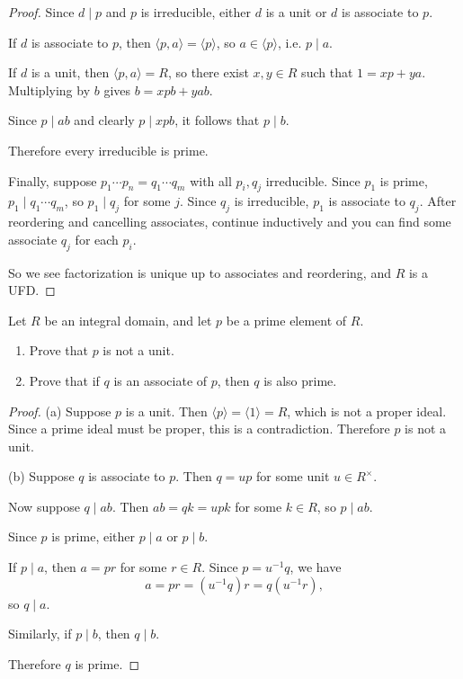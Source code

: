 \documentclass[addpoints,10pt]{exam}
\theoremstyle{plain}
\theoremstyle{definition}
\newtheorem{prob}[thm]{Problem}
\theoremstyle{plain}
\theoremstyle{definition}
\let\oldprob\prob
\let\endoldprob\endprob
\renewenvironment{prob}
  {\begin{singlespace}\oldprob}
  {\endoldprob\end{singlespace}}
\begin{document}
\begin{proof}
Since $d\mid p$ and $p$ is irreducible, either $d$ is a unit or $d$ is
associate to $p$.

If $d$ is associate to $p$, then
$\langle p,a\rangle=\langle p\rangle$,
so $a\in\langle p\rangle$, i.e. $p\mid a$.

If $d$ is a unit, then
$\langle p,a\rangle=R$, so there exist $x,y\in R$ such that
$1=xp+ya$.
Multiplying by $b$ gives
$b=xpb+yab$.

Since $p\mid ab$ and clearly $p\mid xpb$, it follows that $p\mid b$.

Therefore every irreducible is prime.

Finally, suppose
$p_1\cdots p_n=q_1\cdots q_m$
with all $p_i,q_j$ irreducible. Since $p_1$ is prime,
$p_1\mid q_1\cdots q_m$, so $p_1\mid q_j$ for some $j$. Since $q_j$ is
irreducible, $p_1$ is associate to $q_j$. After reordering and cancelling
associates, continue inductively and you can find some associate $q_{j}$ for each $p_{i}$.

So we see factorization is unique up to associates and reordering, and $R$
is a UFD.
\end{proof}

\newpage
\begin{prob}
Let $R$ be an integral domain, and let $p$ be a prime element of $R$.

\begin{enumerate}[label=(\alph*)]
\item Prove that $p$ is not a unit.

\item Prove that if $q$ is an associate of $p$, then $q$ is also prime.
\end{enumerate}
\end{prob}

\begin{proof}
(a)
Suppose $p$ is a unit. Then
$\langle p\rangle=\langle 1\rangle=R$,
which is not a proper ideal. Since a prime ideal must be proper, this is
a contradiction. Therefore $p$ is not a unit.

(b)
Suppose $q$ is associate to $p$. Then
$q=up$
for some unit $u\in R^\times$.

Now suppose $q\mid ab$. Then
$ab=qk=upk$
for some $k\in R$, so $p\mid ab$.

Since $p$ is prime, either $p\mid a$ or $p\mid b$.

If $p\mid a$, then
$a=pr$
for some $r\in R$. Since $p=u^{-1}q$, we have
\[
a=pr=(u^{-1}q)r=q(u^{-1}r),
\]
so $q\mid a$.

Similarly, if $p\mid b$, then $q\mid b$.

Therefore $q$ is prime.
\end{proof}
\end{document}
